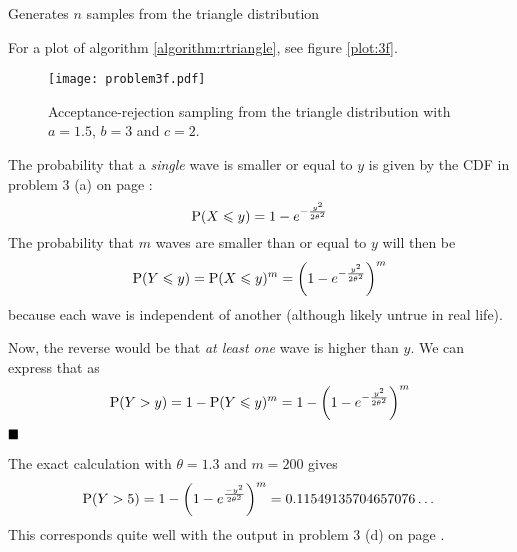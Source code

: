 \documentclass[a4paper,english,12pt]{article}
\begin{document}
\begin{algorithm}
  \caption{Generates $n$ samples from the triangle distribution}
  \label{algorithm:rtriangle}
  \begin{algorithmic}[1]
        \State {}
      \Else
        \State {}
      \EndIf
    \EndFunction
        \Repeat
           
      \EndFor
      \State {}
    \EndFunction
  \end{algorithmic}
\end{algorithm}

For a plot of algorithm \vref{algorithm:rtriangle}, see figure \vref{plot:3f}.

\begin{figure}
  \centering
  \texttt{[image: problem3f.pdf]}
  \caption{Acceptance-rejection sampling from the triangle distribution with
  $a=1.5$, $b=3$ and $c=2$.}
  \label{plot:3f}
\end{figure}

The probability that a \textit{single} wave is smaller or equal to $y$ is given
by the CDF in problem 3 (a) on page \pageref{problem:3a}:
\[
  \mathrm{P}(X\leqslant y) = 1 - e^{-\frac{y^2}{2\theta^2}}
\]
The probability that $m$ waves are smaller than or equal to $y$ will then be
\[
  \mathrm{P}(Y \leqslant y)
    = \mathrm{P}(X\leqslant y)^m
    = \left( 1 - e^{-\frac{y^2}{2\theta^2}} \right)^m
\]
because each wave is independent of another (although likely untrue in real
life).

Now, the reverse would be that \textit{at least one} wave is higher than $y$.
We can express that as
\[
  \mathrm{P}(Y > y) = 1 - \mathrm{P}(Y \leqslant y)^m = 1 - \left(1 -
                    e^{-\frac{y^2}{2\theta^2}} \right)^m
\]
$\hfill\blacksquare$

The exact calculation with $\theta=1.3$ and $m=200$ gives
\[
  \mathrm{P}(Y>5) = 1 - \left(1 - e^{\frac{-y^2}{2\theta^2}} \right)^m
   = 0.11549135704657076\dots
\]
This corresponds quite well with the output in problem 3 (d) on page
\pageref{problem:3d}.


\clearpage


\end{document}
